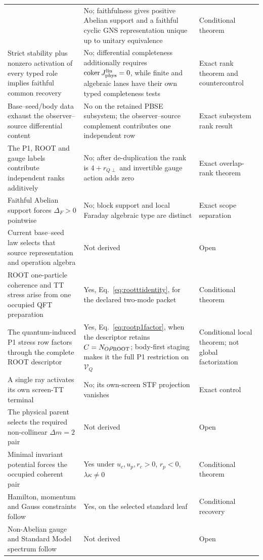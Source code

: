\documentclass[11pt]{article}
\begin{document}
\begin{longtable}{@{}p{}p{}p{}@{}}
& No; faithfulness gives positive Abelian support and a faithful cyclic GNS
representation unique up to unitary equivalence & Conditional theorem\\
Strict stability plus nonzero activation of every typed role implies faithful
common recovery & No; differential completeness additionally requires
$\operatorname{coker}J_{\rm phys}^{\rm lin}=0$, while finite and algebraic
lanes have their own typed completeness tests & Exact rank theorem and
countercontrol\\
Base--seed/body data exhaust the observer--source differential content & No
on the retained PBSE subsystem; the observer--source complement contributes
one independent row & Exact subsystem rank result\\
The P1, ROOT and gauge labels contribute independent ranks additively & No;
after de-duplication the rank is $4+r_{Q\perp}$ and invertible gauge action
adds zero & Exact overlap-rank theorem\\
Faithful Abelian support forces $\Delta_F>0$ pointwise & No; block support and
local Faraday algebraic type are distinct & Exact scope separation\\
Current base--seed law selects that source representation and operation
algebra & Not derived & Open\\
ROOT one-particle coherence and TT stress arise from one occupied QFT preparation & Yes,
Eq.~\eqref{eq:rootttidentity}, for the declared two-mode packet & Conditional theorem\\
The quantum-induced P1 stress row factors through the complete ROOT descriptor & Yes,
Eq.~\eqref{eq:rootp1factor}, when the descriptor retains $C=N_O\rho_{\rm ROOT}$; body-first staging makes it the full P1 restriction on $\mathcal V_Q$ & Conditional local theorem; not global factorization\\
A single ray activates its own screen-TT terminal & No; its own-screen STF
projection vanishes & Exact control\\
The physical parent selects the required non-collinear $\Delta m=2$ pair &
Not derived & Open\\
Minimal invariant potential forces the occupied coherent pair & Yes under
$u_c,u_p,r_c>0$, $r_p<0$, $\lambda\kappa\neq0$ & Conditional theorem\\
Hamilton, momentum and Gauss constraints follow & Yes, on the selected
standard leaf & Conditional recovery\\
Non-Abelian gauge and Standard Model spectrum follow & Not derived & Open\\

\end{longtable}
\end{document}
